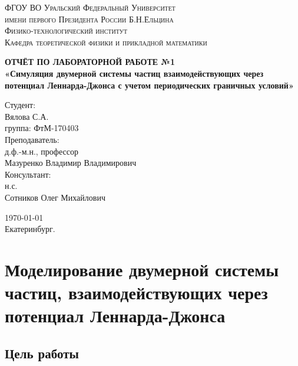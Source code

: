 \documentclass[14pt,a4paper,report]{ncc}
\begin{document}
\def\contentsname{Содержание}

\begin{titlepage}
\begin{center}
\textsc{ФГОУ ВО Уральский Федеральный Университет \\ имени первого Президента России Б.Н.Ельцина\\[5mm]
Физико-технологический институт\\[2mm]
Кафедра теоретической физики и прикладной математики}

\vfill

\textbf{ОТЧЁТ ПО ЛАБОРАТОРНОЙ РАБОТЕ №1\\[3mm]
«Симуляция двумерной системы частиц взаимодействующих через потенциал Леннарда-Джонса с учетом периодических граничных условий»\\[6mm]
}
\end{center}

\hfill
\begin{minipage}{.5\textwidth}
Студент:\\[2mm] 
Вялова С.А.\\
группа: ФтМ-170403 \\[5mm]

Преподаватель:\\[2mm] 
д.ф.-м.н., профессор\\
Мазуренко Владимир Владимирович\\[5mm]

Консультант:\\[2mm] 
н.с.\\
Сотников Олег Михайлович\\

\end{minipage}%
\vfill
\begin{center}
\today  \\
 Екатеринбург.
\end{center}
\end{titlepage}

\tableofcontents
\newpage
\chapter{Моделирование двумерной системы частиц, взаимодействующих через потенциал Леннарда-Джонса}
\section{Цель работы}
\end{document}
